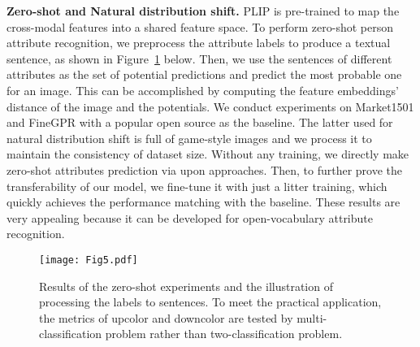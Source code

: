\documentclass[10pt,twocolumn,letterpaper]{article}
\begin{document}
\noindent\textbf{Zero-shot and Natural distribution shift.}
PLIP is pre-trained to map the cross-modal features into a shared feature space. To perform zero-shot person attribute recognition, we preprocess the attribute labels to produce a textual sentence, as shown in Figure~\ref{fig:label2sentence} below. Then, we use the sentences of different attributes as the set of potential predictions and predict the most probable one for an image. This can be accomplished by computing the feature embeddings' distance of the image and the potentials. We conduct experiments on Market1501 and FineGPR with a popular open source as the baseline. The latter used for natural distribution shift is full of game-style images and we process it to maintain the consistency of dataset size. Without any training, we directly make zero-shot attributes prediction via upon approaches. Then, to further prove the transferability of our model, we fine-tune it with just a litter training, which quickly achieves the performance matching with the baseline. These results are very appealing because it can be developed for open-vocabulary attribute recognition.

\begin{figure}[htb]
\centering \texttt{[image: Fig5.pdf]}
\caption{Results of the zero-shot experiments and the illustration of processing the labels to sentences. To meet the practical application, the metrics of upcolor and downcolor are tested by multi-classification problem rather than two-classification problem. }
\label{fig:label2sentence}
\end{figure}
\end{document}
